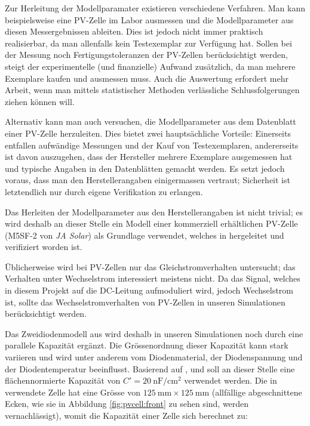 Zur Herleitung der Modellparamater existieren verschiedene Verfahren. Man kann
beispielsweise eine  PV-Zelle im Labor  ausmessen und die  Modellparameter aus
diesen  Messergebnissen  ableiten.   Dies  ist jedoch  nicht  immer  praktisch
realisierbar, da man allenfalls kein Testexemplar zur Verf\"ugung hat.  Sollen
bei  der  Messung  noch Fertigungstoleranzen  der  PV-Zellen  ber\"ucksichtigt
werden,  steigt der  experimentelle  (und  finanzielle) Aufwand  zus\"atzlich,
da  man  mehrere Exemplare  kaufen  und  ausmessen muss. Auch  die  Auswertung
erfordert mehr Arbeit, wenn  man mittels statistischer Methoden verl\"assliche
Schlussfolgerungen ziehen k\"onnen will.

Alternativ   kann   man   auch   versuchen,  die   Modellparameter   aus   dem
Datenblatt  einer  PV-Zelle  herzuleiten. Dies  bietet  zwei  haupts\"achliche
Vorteile: Einerseits  entfallen  aufw\"andige  Messungen   und  der  Kauf  von
Testexemplaren, andererseits ist davon auszugehen, dass der Hersteller mehrere
Exemplare ausgemessen hat  und typische Angaben in  den Datenbl\"atten gemacht
werden.  Es setzt jedoch voraus,  dass man den Herstellerangaben einigermassen
vertraut;  Sicherheit  ist  letztendlich  nur  durch  eigene  Verifikation  zu
erlangen.

Das Herleiten der Modellparameter aus den Herstellerangaben ist nicht trivial;
es wird deshalb  an dieser Stelle ein Modell  einer kommerziell erh\"altlichen
PV-Zelle  (M5SF-2 von  \emph{JA Solar})  als Grundlage  verwendet, welches  in
\cite{pvcell:masmoudi} hergeleitet und verifiziert worden ist.

\"Ublicherweise wird  bei PV-Zellen  nur das  Gleichstromverhalten untersucht;
das Verhalten  unter Wechselstrom interessiert meistens  nicht. Da das Signal,
welches  in  diesem  Projekt  auf die  DC-Leitung  aufmoduliert  wird,  jedoch
Wechselstrom ist,  sollte das  Wechselstromverhalten von PV-Zellen  in unseren
Simulationen ber\"ucksichtigt werden.

Das  Zweidiodenmodell  aus  \cite{pvcell:masmoudi}  wird  deshalb  in  unseren
Simulationen   noch   durch    eine   parallele   Kapazit\"at   erg\"anzt. Die
Gr\"ossenordnung   dieser   Kapazit\"at   kann  stark   variieren   und   wird
unter    anderem   vom    Diodenmaterial,   der    Diodenspannung   und    der
Diodentemperatur   beeinflusst. Basierend    auf   \cite{capacitance:hegedus},
\cite{capacitance:mandal}     und      \cite{capacitance:mauk}     soll     an
dieser    Stelle   eine    fl\"achennormierte    Kapazit\"at    von   $C'    =
\SI{20}{\nano\farad\per\centi\meter\squared}$    verwendet   werden. Die    in
\cite{pvcell:masmoudi}    verwendete    Zelle    hat   eine    Gr\"osse    von
$\SI{125}{\milli\meter}    \times     \SI{125}{\milli\meter}$    (allf\"allige
abgeschnittene  Ecken, wie  sie in  Abbildung \ref{fig:pvcell:front}  zu sehen
sind,  werden  vernachl\"assigt),  womit  die  Kapazit\"at  einer  Zelle  sich
berechnet zu:

